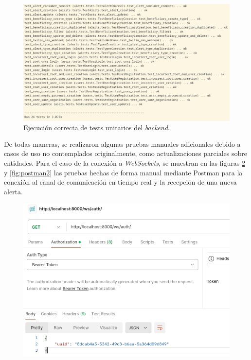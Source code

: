 \begin{figure}[H]
	\centering
	\includegraphics[width=1\textwidth]{./Figures/tests-unitarios.png}
	\caption{Ejecución correcta de tests unitarios del \textit{backend}.}
	\label{fig:tests-unitarios}
\end{figure}

De todas maneras, se realizaron algunas pruebas manuales adicionales debido a casos de uso no contemplados originalmente, como actualizaciones parciales sobre entidades. Para el caso de la conexión a \textit{WebSockets}, se muestran en las figuras \ref{fig:postman1} y \ref{fig:postman2} las pruebas hechas de forma manual mediante Postman para la conexión al canal de comunicación en tiempo real y la recepción de una nueva alerta. 

\begin{figure}[H]
	\centering
  	\includegraphics[width=0.9\linewidth]{./Figures/postman1.png}
  	\label{fig:postman1}
\end{figure}

